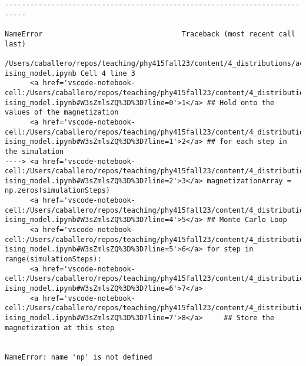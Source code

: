 \begin{verbatim}
---------------------------------------------------------------------------

NameError                                 Traceback (most recent call last)

/Users/caballero/repos/teaching/phy415fall23/content/4_distributions/activity-ising_model.ipynb Cell 4 line 3
      <a href='vscode-notebook-cell:/Users/caballero/repos/teaching/phy415fall23/content/4_distributions/activity-ising_model.ipynb#W3sZmlsZQ%3D%3D?line=0'>1</a> ## Hold onto the values of the magnetization 
      <a href='vscode-notebook-cell:/Users/caballero/repos/teaching/phy415fall23/content/4_distributions/activity-ising_model.ipynb#W3sZmlsZQ%3D%3D?line=1'>2</a> ## for each step in the simulation
----> <a href='vscode-notebook-cell:/Users/caballero/repos/teaching/phy415fall23/content/4_distributions/activity-ising_model.ipynb#W3sZmlsZQ%3D%3D?line=2'>3</a> magnetizationArray = np.zeros(simulationSteps)
      <a href='vscode-notebook-cell:/Users/caballero/repos/teaching/phy415fall23/content/4_distributions/activity-ising_model.ipynb#W3sZmlsZQ%3D%3D?line=4'>5</a> ## Monte Carlo Loop
      <a href='vscode-notebook-cell:/Users/caballero/repos/teaching/phy415fall23/content/4_distributions/activity-ising_model.ipynb#W3sZmlsZQ%3D%3D?line=5'>6</a> for step in range(simulationSteps):
      <a href='vscode-notebook-cell:/Users/caballero/repos/teaching/phy415fall23/content/4_distributions/activity-ising_model.ipynb#W3sZmlsZQ%3D%3D?line=6'>7</a>     
      <a href='vscode-notebook-cell:/Users/caballero/repos/teaching/phy415fall23/content/4_distributions/activity-ising_model.ipynb#W3sZmlsZQ%3D%3D?line=7'>8</a>     ## Store the magnetization at this step


NameError: name 'np' is not defined
\end{verbatim}

\begin{Shaded}
\begin{Highlighting}[]
\OperatorTok{=}\NormalTok{(}\NormalTok{,}\NormalTok{))}\OperatorTok{;}
\OperatorTok{=}\OperatorTok{=}\NormalTok{)}\OperatorTok{;}
\NormalTok{)}\OperatorTok{;}
\end{Highlighting}
\end{Shaded}

